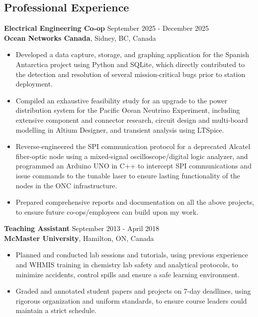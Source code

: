 \documentclass[line,margin]{res}
\begin{document}
\begin{resume}
\section{Professional Experience}
    \textbf{Electrical Engineering Co-op} \hfill September 2025 - December 2025 \\
    \textbf{Ocean Networks Canada}, Sidney, BC, Canada
    \begin{itemize}  \itemsep -2pt
        \item Developed a data capture, storage, and graphing application for the Spanish Antarctica project using Python and SQLite, which directly contributed to the detection and resolution of several mission-critical bugs prior to station deployment.
        \item Compiled an exhaustive feasibility study for an upgrade to the power distribution system for the Pacific Ocean Neutrino Experiment, including extensive component and connector research, circuit design and multi-board modelling in Altium Designer, and transient analysis using LTSpice.
        \item Reverse-engineered the SPI communication protocol for a deprecated Alcatel fiber-optic node using a mixed-signal oscilloscope/digital logic analyzer, and programmed an Arduino UNO in C++ to intercept SPI communications and issue commands to the tunable laser to ensure lasting functionality of the nodes in the ONC infrastructure.
        \item Prepared comprehensive reports and documentation on all the above projects, to ensure future co-ops/employees can build upon my work.
    \end{itemize} 
    \textbf{Teaching Assistant} \hfill September 2013 - April 2018 \\
    \textbf{McMaster University}, Hamilton, ON, Canada
    \begin{itemize}  \itemsep -2pt
        \item Planned and conducted lab sessions and tutorials, using previous experience and WHMIS training in chemistry lab safety and analytical protocols, to minimize accidents, control spills and ensure a safe learning environment.
        \item Graded and annotated student papers and projects on 7-day deadlines, using rigorous organization and uniform standards, to ensure course leaders could maintain a strict schedule.
    \end{itemize} 


\end{resume}
\end{document}
